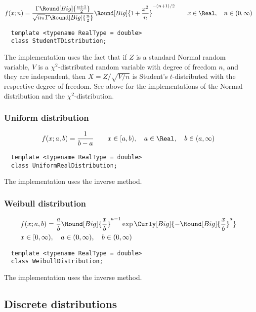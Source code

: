 \begin{equation*}
  f(x;n) =
  \frac{\Gamma\Round[Big]{\frac{n + 1}{2}}}
  {\sqrt{n\pi}\Gamma\Round[Big]{\frac{n}{2}}}
  \Round[Big]{1 + \frac{x^2}{n}}^{-(n + 1)/2} \qquad
  x \in \Real,\quad n \in (0, \infty)
\end{equation*}
\begin{Verbatim}
  template <typename RealType = double>
  class StudentTDistribution;
\end{Verbatim}
The implementation uses the fact that if $Z$ is a standard Normal random
variable, $V$ is a $\chi^2$-distributed random variable with degree of freedom
$n$, and they are independent, then $X = Z / \sqrt{V / n}$ is Student's
$t$-distributed with the respective degree of freedom. See above for the
implementations of the Normal distribution and the $\chi^2$-distribution.

\subsubsection{Uniform distribution}

\begin{equation*}
  f(x;a,b) = \frac{1}{b - a} \qquad
  x \in [a, b),\quad a \in \Real,\quad b \in (a, \infty)
\end{equation*}
\begin{Verbatim}
  template <typename RealType = double>
  class UniformRealDistribution;
\end{Verbatim}
The implementation uses the inverse method.

\subsubsection{Weibull distribution}

\begin{align*}
  &f(x;a,b) = \frac{a}{b}\Round[Big]{\frac{x}{b}}^{a - 1}
  \exp\Curly[Big]{-\Round[Big]{\frac{x}{b}}^a} \\
  &x \in [0, \infty),\quad a \in (0, \infty),\quad b \in (0, \infty)
\end{align*}
\begin{Verbatim}
  template <typename RealType = double>
  class WeibullDistribution;
\end{Verbatim}
The implementation uses the inverse method.

\subsection{Discrete distributions}
\label{sub:Discrete distributions}


